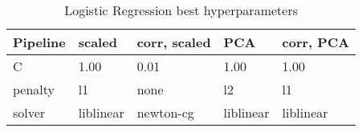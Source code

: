 \begin{table}[!htb]
\caption{Logistic Regression best hyperparameters}
\label{table-logistic-regression-params}
\centering
\begin{tabular}{lllll}
\toprule
Pipeline & scaled & corr, scaled & PCA & corr, PCA \\
\midrule
C & 1.00 & 0.01 & 1.00 & 1.00 \\
penalty & l1 & none & l2 & l1 \\
solver & liblinear & newton-cg & liblinear & liblinear \\
\bottomrule
\end{tabular}
\end{table}
